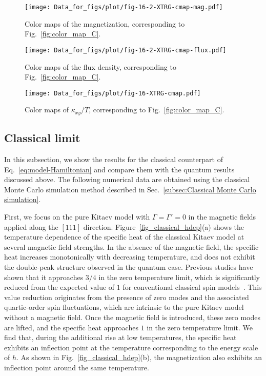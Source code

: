 \documentclass[twocolumn,superscriptaddress,showpacs, longbibliography, aps, prx]{revtex4-2}
\begin{document}
\begin{figure*}[htb]
  \begin{center}
    \texttt{[image: Data\_for\_figs/plot/fig-16-2-XTRG-cmap-mag.pdf]}
  \end{center}
  \caption{
Color maps of the magnetization, corresponding to Fig.~\ref{fig:color_map_C}.} 
  \label{fig:color_map_mag}
\end{figure*}

\begin{figure*}[htb]
  \begin{center}
    \texttt{[image: Data\_for\_figs/plot/fig-16-2-XTRG-cmap-flux.pdf]}
  \end{center}
  \caption{
Color maps of the flux density, corresponding to Fig.~\ref{fig:color_map_C}.} 
  \label{fig:color_map_flux}
\end{figure*}


\begin{figure*}[htb]
  \begin{center}
    \texttt{[image: Data\_for\_figs/plot/fig-16-XTRG-cmap.pdf]}
  \end{center}
  \caption{
Color maps of $\kappa_{xy}/T$, corresponding to Fig.~\ref{fig:color_map_C}.} 
  \label{fig:color_map_all}
\end{figure*}

\subsection{Classical limit}
\label{sec:classicalMC}

In this subsection, we show the results for the classical counterpart of Eq.~\eqref{eq:model-Hamiltonian} and compare them with the quantum results discussed above.
The following numerical data are obtained using the classical Monte Carlo simulation method described in Sec.~\ref{subsec:Classical Monte Carlo simulation}. 

First, we focus on the pure Kitaev model with $\Gamma=\Gamma'=0$ in the magnetic fields applied along the $[111]$ direction.
Figure~\ref{fig_classical_hdep}(a) shows the temperature dependence of the specific heat of the classical Kitaev model at several magnetic field strengths. 
In the absence of the magnetic field, the specific heat increases monotonically with decreasing temperature, and does not exhibit the double-peak structure observed in the quantum case. 
Previous studies have shown that it approaches $3/4$ in the zero temperature limit, which is significantly reduced from the expected value of $1$ for conventional classical spin models~\cite{Sela2014,Suzuki2018_2}.
This value reduction originates from the presence of zero modes and the associated quartic-order spin fluctuations, which are intrinsic to the pure Kitaev model without a magnetic field.
Once the magnetic field is introduced, these zero modes are lifted, and the specific heat approaches $1$ in the zero temperature limit. 
We find that, during the additional rise at low temperatures, the specific heat exhibits an inflection point at the temperature corresponding to the energy scale of $h$. 
As shown in Fig.~\ref{fig_classical_hdep}(b), the magnetization also exhibits an inflection point around the same temperature.
\end{document}

